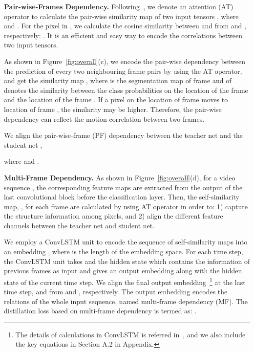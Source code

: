 \documentclass[runningheads]{llncs}
\begin{document}
\noindent\textbf{Pair-wise-Frames Dependency.}
Following~\cite{liu2019structured}, we denote an attention (AT) operator to calculate the pair-wise similarity map  of two input tensors , where  and . For the pixel  in , we calculate the cosine similarity between  and  from  and , respectively: . It is an efficient and easy way to encode the correlations between two input tensors.

As shown in Figure~\ref{fig:overall}(c), we encode the pair-wise dependency between the prediction of every two neighbouring frame pairs by using the AT operator, and get the similarity map , where  is the segmentation map of frame  and  of  denotes the similarity between the class probabilities on the location  of the frame  and the location  of the frame . If a pixel on the location  of frame  moves to location  of frame , the similarity  may be higher. Therefore, the pair-wise dependency can reflect the motion correlation between two frames.

We align the pair-wise-frame (PF) dependency between the teacher net  and the student net ,

\noindent where  and .






\noindent\textbf{Multi-Frame Dependency.} As shown in Figure~\ref{fig:overall}(d), for a video sequence , the corresponding feature maps
 are extracted from the output of the last convolutional block before the classification layer. Then, the self-similarity map, , for each frame are calculated by using AT operator in order to: 1) capture the structure information among pixels, and 2) align the different feature channels between the teacher net and student net.

We employ a ConvLSTM unit to encode the sequence of self-similarity maps into an embedding , where  is the length of the embedding space.
For each time step, the ConvLSTM unit takes  and the hidden state which contains the information of previous  frames as input and gives an output embedding  along with the hidden state of the current time step. We align the final output embedding~\footnote{The details of calculations in ConvLSTM is referred in~\cite{ConvLSTM}, and we also include the key equations in Section A.2 in Appendix.} at the last time step,    and   from  and , respectively. The output embedding encodes the relations of the whole input sequence, named multi-frame dependency (MF). The distillation loss based on multi-frame dependency is termed as: .
\end{document}

